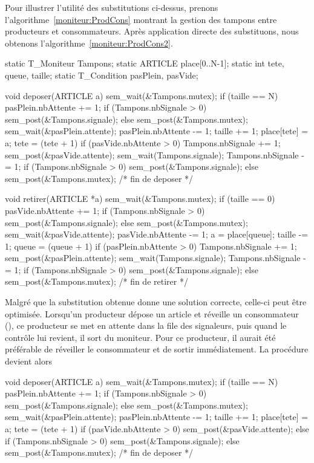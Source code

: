 Pour illustrer l'utilité des substitutions ci-dessus, prenons l'algorithme~\ref{moniteur:ProdCons} montrant la gestion des tampons entre producteurs et consommateurs. Après application directe des substituons, nous obtenons l'algorithme~\ref{moniteur:ProdCons2}.

\begin{codeblock}[title=Problème des producteurs et des consommateurs à un tampon (sans optimisation),label=moniteur:ProdCons2]
static T_Moniteur Tampons;
static ARTICLE place[0..N-1];
static int tete, queue, taille;
static T_Condition pasPlein, pasVide;

void deposer(ARTICLE a) {
  sem_wait(&Tampons.mutex);
  if (taille == N) {
     pasPlein.nbAttente += 1;
     if (Tampons.nbSignale > 0)
        sem_post(&Tampons.signale);
     else sem_post(&Tampons.mutex);
     sem_wait(&pasPlein.attente);
     pasPlein.nbAttente -= 1;
  }
  taille += 1;
  place[tete] = a;
  tete = (tete + 1) %
  if (pasVide.nbAttente > 0) {
     Tampons.nbSignale += 1;
     sem_post(&pasVide.attente);
     sem_wait(Tampons.signale);
     Tampons.nbSignale -= 1;
  }
  if (Tampons.nbSignale > 0)
     sem_post(&Tampons.signale);
  else
     sem_post(&Tampons.mutex);
} /* fin de deposer */

void retirer(ARTICLE *a) {
  sem_wait(&Tampons.mutex);
  if (taille == 0) {
     pasVide.nbAttente += 1;
     if (Tampons.nbSignale > 0)
        sem_post(&Tampons.signale);
     else sem_post(&Tampons.mutex);
     sem_wait(&pasVide.attente);
     pasVide.nbAttente -= 1;
  }
  a = place[queue];
  taille -= 1;
  queue = (queue + 1) %
  if (pasPlein.nbAttente > 0) {
     Tampons.nbSignale += 1;
     sem_post(&pasPlein.attente);
     sem_wait(Tampons.signale);
     Tampons.nbSignale -= 1;
  }
  if (Tampons.nbSignale > 0)
     sem_post(&Tampons.signale);
  else
     sem_post(&Tampons.mutex);
} /* fin de retirer */
\end{codeblock}

Malgré que la substitution obtenue donne une solution correcte, celle-ci peut être optimisée. Lorsqu'un producteur dépose un article et réveille un consommateur (), ce producteur se met en attente dans la file des signaleurs, puis quand le contrôle lui revient, il sort du moniteur. Pour ce producteur, il aurait été préférable de réveiller le consommateur et de sortir immédiatement. La procédure  devient alors %
\begin{codeblock}
void deposer(ARTICLE a) {
  sem_wait(&Tampons.mutex);
  if (taille == N) {
     pasPlein.nbAttente += 1;
     if (Tampons.nbSignale > 0)
        sem_post(&Tampons.signale);
     else sem_post(&Tampons.mutex);
     sem_wait(&pasPlein.attente);
     pasPlein.nbAttente -= 1;
  }
  taille += 1;
  place[tete] = a;
  tete = (tete + 1) %
  if (pasVide.nbAttente > 0)
     sem_post(&pasVide.attente);
  else if (Tampons.nbSignale > 0)
     sem_post(&Tampons.signale);
  else
     sem_post(&Tampons.mutex);
} /* fin de deposer */
\end{codeblock}

